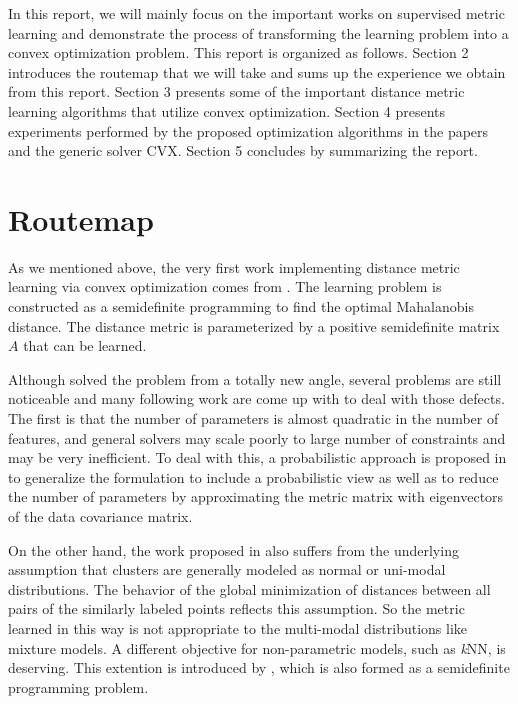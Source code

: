 \documentclass[12pt]{article}
\newcommand{\knn}{\textit{k}NN}
\begin{document}
In this report, we will mainly focus on the important works on supervised metric learning and demonstrate the process of transforming the learning problem into a convex optimization problem. This report is organized as follows. Section 2 introduces the routemap that we will take and sums up the experience we obtain from this report. Section 3 presents some of the important distance metric learning algorithms that utilize convex optimization. Section 4 presents experiments  performed by the proposed optimization algorithms in the papers and the generic solver CVX. Section 5 concludes by summarizing the report.

\section{Routemap}

As we mentioned above, the very first work implementing distance metric learning via convex optimization comes from \cite{xing2003distance}. The learning problem is constructed as a semidefinite programming to find the optimal Mahalanobis distance.
The distance metric is parameterized by a positive semidefinite matrix $A$ that can be learned. 

Although \cite{xing2003distance} solved the problem from a totally new angle, several problems are still noticeable and many following work are come up with to deal with those defects. The first is that the number of parameters is almost quadratic in the number of features, %
and general solvers may scale poorly to large number of constraints and may be very inefficient. 
To deal with this, a probabilistic approach is proposed in \cite{yang2006efficient} to generalize the formulation to include a probabilistic view as well as to reduce the number of parameters by approximating the metric matrix with eigenvectors of the data covariance matrix.

On the other hand, the work proposed in \cite{xing2003distance} also suffers from the underlying assumption that clusters are generally modeled as normal or uni-modal distributions. The behavior of the global minimization of distances between all pairs of the similarly labeled points reflects this assumption. So the metric learned in this way is not appropriate to the multi-modal distributions like mixture models. A different objective for non-parametric models, such as \knn, is deserving. This extention is introduced by \cite{weinberger2009distance}, which is also formed as a semidefinite programming problem. 
\end{document}
